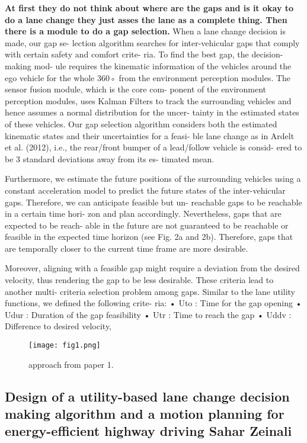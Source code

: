 \documentclass{article}
\begin{document}
\textbf{At first they do not think about where are the gaps and is it okay to do a lane change
they just asses the lane as a complete thing. Then there is a module to do a gap selection. }
When a lane change decision is made, our gap se-
lection algorithm searches for inter-vehicular gaps
that comply with certain safety and comfort crite-
ria. To find the best gap, the decision-making mod-
ule requires the kinematic information of the vehicles
around the ego vehicle for the whole 360◦ from the
environment perception modules.
The sensor fusion module, which is the core com-
ponent of the environment perception modules, uses
Kalman Filters to track the surrounding vehicles and
hence assumes a normal distribution for the uncer-
tainty in the estimated states of these vehicles.
Our gap selection algorithm considers both the estimated
kinematic states and their uncertainties for a feasi-
ble lane change as in Ardelt et al. (2012), i.e., the
rear/front bumper of a lead/follow vehicle is consid-
ered to be 3 standard deviations away from its es-
timated mean.

Furthermore, we estimate the future positions of
the surrounding vehicles using a constant acceleration
model to predict the future states of the inter-vehicular
gaps. Therefore, we can anticipate feasible but un-
reachable gaps to be reachable in a certain time hori-
zon and plan accordingly.
Nevertheless, gaps that are expected to be reach-
able in the future are not guaranteed to be reachable
or feasible in the expected time horizon (see Fig. 2a
and 2b). Therefore, gaps that are temporally closer to
the current time frame are more desirable.

Moreover,
aligning with a feasible gap might require a deviation
from the desired velocity, thus rendering the gap to
be less desirable. These criteria lead to another multi-
criteria selection problem among gaps. Similar to the
lane utility functions, we defined the following crite-
ria:
• Uto : Time for the gap opening
• Udur : Duration of the gap feasibility
• Utr : Time to reach the gap
• Uddv : Difference to desired velocity,

\begin{figure}
  \texttt{[image: fig1.png]}
  \caption{approach from paper 1.}
  \label{fig:Gui}
\end{figure}


  \subsection{Design of a utility-based lane change decision making algorithm and a
motion planning for energy-efficient highway driving
Sahar Zeinali}
  
\end{document}
